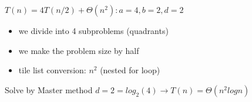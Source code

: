 \documentclass[11pt]{article}
\begin{document}
\(T(n) = 4T(n/2) + \Theta(n^2): a = 4, b = 2, d = 2\)

\begin{itemize}
\item
  we divide into 4 subproblems (quadrants)
\item
  we make the problem size by half
\item
  tile list conversion: \(n^2\) (nested for loop)
\end{itemize}

Solve by Master method
\(d=2=log_2(4) \rightarrow T(n) = \Theta(n^2logn)\)
\end{document}
